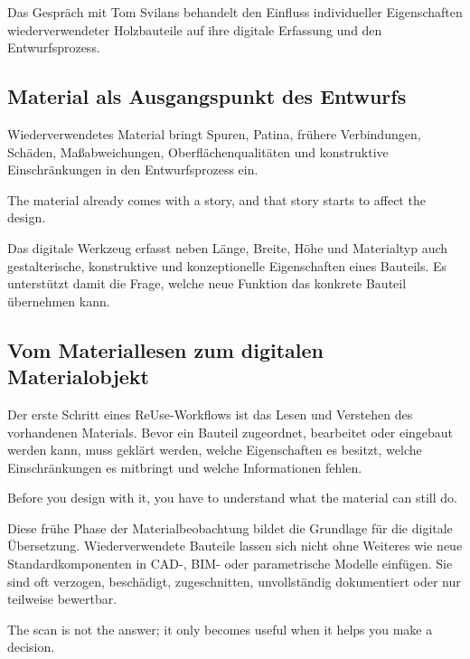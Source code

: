 \label{anlage:interview-svilans}

Das Gespräch mit Tom Svilans behandelt den Einfluss individueller Eigenschaften wiederverwendeter Holzbauteile auf ihre digitale Erfassung und den Entwurfsprozess.

\subsection{Material als Ausgangspunkt des Entwurfs}

Wiederverwendetes Material bringt Spuren, Patina, frühere Verbindungen, Schäden, Maßabweichungen, Oberflächenqualitäten und konstruktive Einschränkungen in den Entwurfsprozess ein.

\begin{Blockquote}
The material already comes with a story, and that story starts to affect the design.
\end{Blockquote}

Das digitale Werkzeug erfasst neben Länge, Breite, Höhe und Materialtyp auch gestalterische, konstruktive und konzeptionelle Eigenschaften eines Bauteils. Es unterstützt damit die Frage, welche neue Funktion das konkrete Bauteil übernehmen kann.

\subsection{Vom Materiallesen zum digitalen Materialobjekt}

Der erste Schritt eines ReUse-Workflows ist das Lesen und Verstehen des vorhandenen Materials. Bevor ein Bauteil zugeordnet, bearbeitet oder eingebaut werden kann, muss geklärt werden, welche Eigenschaften es besitzt, welche Einschränkungen es mitbringt und welche Informationen fehlen.

\begin{Blockquote}
Before you design with it, you have to understand what the material can still do.
\end{Blockquote}

Diese frühe Phase der Materialbeobachtung bildet die Grundlage für die digitale Übersetzung. Wiederverwendete Bauteile lassen sich nicht ohne Weiteres wie neue Standardkomponenten in CAD-, BIM- oder parametrische Modelle einfügen. Sie sind oft verzogen, beschädigt, zugeschnitten, unvollständig dokumentiert oder nur teilweise bewertbar.

\begin{Blockquote}
The scan is not the answer; it only becomes useful when it helps you make a decision.
\end{Blockquote}

